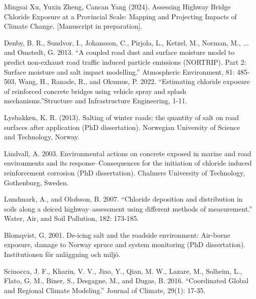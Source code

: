 \documentclass[12pt]{article}
\newcounter{refnum} %
\begin{document}
\begin{enumerate}[label={[\arabic*]}]
\item {} \label{ref7}
Mingsai Xu, Yuxin Zheng, Cancan Yang (2024). Assessing Highway Bridge Chloride Exposure at a Provincial Scale: Mapping and Projecting Impacts of Climate Change.  [Manuscript in preparation].

\item {} \label{ref8}
Denby, B. R., Sundvor, I., Johansson, C., Pirjola, L., Ketzel, M., Norman, M., ... and Omstedt, G. 2013. “A coupled road dust and surface moisture model to predict non-exhaust road traffic induced particle emissions (NORTRIP). Part 2: Surface moisture and salt impact modelling.” Atmospheric Environment, 81: 485-503, Wang, H., Ranade, R., and Okumus, P. 2022. “Estimating chloride exposure of reinforced concrete bridges using vehicle spray and splash mechanisms.”Structure and Infrastructure Engineering, 1-11. 

\item {} \label{ref9}
Lysbakken, K. R. (2013). Salting of winter roads: the quantity of salt on road surfaces after application (PhD dissertation). Norwegian University of Science and Technology, Norway.

\item {} \label{ref10}
Lindvall, A. 2003. Environmental actions on concrete exposed in marine and road environments and its response–Consequences for the initiation of chloride induced reinforcement corrosion (PhD dissertation). Chalmers University of Technology, Gothenburg, Sweden.

\item {} \label{ref11}
Lundmark, A., and Olofsson, B. 2007. “Chloride deposition and distribution in soils along a deiced highway–assessment using different methods of measurement.” Water, Air, and Soil Pollution, 182: 173-185.

\item {} \label{ref12}
Blomqvist, G. 2001. De-icing salt and the roadside environment: Air-borne exposure, damage to Norway spruce and system monitoring (PhD dissertation). Institutionen för anläggning och miljö.

\item {} \label{ref13}
Scinocca, J. F., Kharin, V. V., Jiao, Y., Qian, M. W., Lazare, M., Solheim, L., Flato, G. M., Biner,  S., Desgagne, M., and Dugas, B. 2016. “Coordinated Global and Regional Climate Modeling.” Journal of Climate, 29(1): 17-35.

\end{enumerate}
\end{document}
